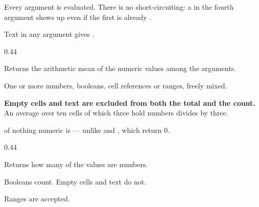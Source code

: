 \begin{ccsteps}
\item Every argument is evaluated. There is no short-circuiting: a
 in the fourth argument shows up even if the first is already
.
\item Text in any argument gives .
\end{ccsteps}

\begin{ccexamples}{0.44\linewidth}
\end{ccexamples}


Returns the arithmetic mean of the numeric values among the arguments.

\begin{ccsteps}
\item One or more numbers, booleans, cell references or ranges, freely mixed.
\end{ccsteps}

\begin{ccsteps}
\item \textbf{Empty cells and text are excluded from both the total and the
count.} An average over ten cells of which three hold numbers divides by three.
\item {} of nothing numeric is  --- unlike  and
, which return 0.
\end{ccsteps}

\begin{ccexamples}{0.44\linewidth}
\end{ccexamples}


Returns how many of the values are numbers.

\begin{ccsteps}
\item Booleans count. Empty cells and text do not.
\item Ranges are accepted.
\end{ccsteps}

